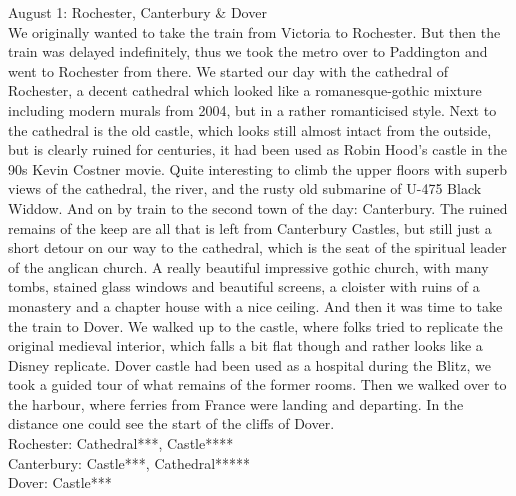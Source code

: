 August 1: Rochester, Canterbury \& Dover\\
We originally wanted to take the train from Victoria to Rochester. But then the train was delayed indefinitely, thus we took the metro over to Paddington and went to Rochester from there. We started our day with the cathedral of Rochester, a decent cathedral which looked like a romanesque-gothic mixture including modern murals from 2004, but in a rather romanticised style. Next to the cathedral is the old castle, which looks still almost intact from the outside, but is clearly ruined for centuries, it had been used as Robin Hood's castle in the 90s Kevin Costner movie. Quite interesting to climb the upper floors with superb views of the cathedral, the river, and the rusty old submarine of U-475 Black Widdow. And on by train to the second town of the day: Canterbury. The ruined remains of the keep are all that is left from Canterbury Castles, but still just a short detour on our way to the cathedral, which is the seat of the spiritual leader of the anglican church. A really beautiful impressive gothic church, with many tombs, stained glass windows and beautiful screens, a cloister with ruins of a monastery and a chapter house with a nice ceiling. And then it was time to take the train to Dover. We walked up to the castle, where folks tried to replicate the original medieval interior, which falls a bit flat though and rather looks like a Disney replicate. Dover castle had been used as a hospital during the Blitz, we took a guided tour of what remains of the former rooms. Then we walked over to the harbour, where ferries from France were landing and departing. In the distance one could see the start of the cliffs of Dover.\\

Rochester: Cathedral***, Castle****\\
Canterbury: Castle***, Cathedral*****\\
 Dover: Castle***\\


